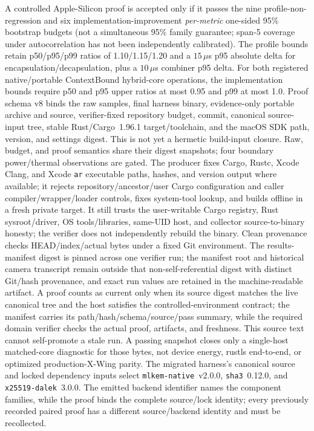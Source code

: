 \documentclass[journal]{IEEEtran}
\newcommand{\code}[1]{\texttt{\small #1}}
\begin{document}
A controlled Apple-Silicon proof is accepted only if it passes the nine
profile-non-regression and six implementation-improvement \emph{per-metric}
one-sided 95\% bootstrap budgets (not a simultaneous 95\% family guarantee;
span-5 coverage under autocorrelation has not been independently calibrated).
The profile bounds retain p50/p95/p99 ratios of 1.10/1.15/1.20 and a
$15\,\mu$s p95 absolute delta for encapsulation/decapsulation, plus a
$10\,\mu$s combiner p95 delta.  For both registered native/portable ContextBound hybrid-core
operations, the implementation bounds require p50 and p95 upper ratios at most
0.95 and p99 at most 1.0.  Proof schema v8 binds the raw samples, final harness
binary, evidence-only portable archive and source, verifier-fixed repository
budget, commit, canonical source-input tree, stable Rust/Cargo~1.96.1 target/toolchain,
and the macOS SDK path, version, and settings digest. This is not yet a
hermetic build-input closure. Raw, budget, and proof semantics share their
digest snapshots; four boundary power/thermal observations are gated. The
producer fixes Cargo, Rustc, Xcode Clang, and Xcode \code{ar} executable paths,
hashes, and version output where available; it rejects
repository/ancestor/user Cargo configuration and caller compiler/wrapper/loader
controls, fixes system-tool lookup, and builds offline in a fresh private target. It still trusts the user-writable
Cargo registry, Rust sysroot/driver, OS tools/libraries, same-UID host, and collector source-to-binary
honesty; the verifier does not independently rebuild the binary. Clean provenance checks
HEAD/index/actual bytes under a fixed Git environment. The
results-manifest digest is pinned across one verifier run; the manifest root and historical
camera transcript remain outside that non-self-referential digest with distinct Git/hash provenance,
and exact run values are retained in the
machine-readable artifact. A proof counts as current only when its source digest matches the live
canonical tree and the host satisfies the controlled-environment contract; the manifest carries
its path/hash/schema/source/pass summary, while the required domain verifier checks the actual proof,
artifacts, and freshness. This source text cannot self-promote a stale run. A passing snapshot
closes only a single-host matched-core diagnostic for those bytes, not device energy, rustls
end-to-end, or optimized production-X-Wing parity.
The migrated harness's canonical source and locked dependency inputs select
\code{mlkem-native}~v2.0.0, \code{sha3}~0.12.0, and
\code{x25519-dalek}~3.0.0. The emitted backend identifier names the component families,
while the proof binds the complete source/lock identity; every previously recorded paired proof
has a different source/backend identity and must be recollected.
\end{document}
